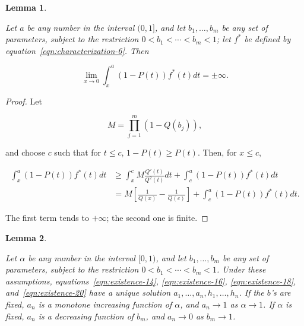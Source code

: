 \documentclass{article}
\newtheorem{lemma}{Lemma}
\theoremstyle{remark}
\begin{document}
\begin{lemma} \label{lemma:infinite-limit}

Let $a$ be any number in the interval $(0, 1]$, and let $b_1, \dots, b_m$ be
any set of parameters, subject to the restriction $0 < b_1 < \cdots < b_m < 1$;
let $f^*$ be defined by equation~\ref{eqn:characterization-6}. Then

\[
\lim_{x \to 0} \int_{x}^a (1-P(t)) f^*(t) dt = \pm \infty.
\]

\end{lemma}

\begin{proof}

Let

\[
M = \prod_{j=1}^m (1 - Q(b_j)),
\]

and choose $c$ such that for $t \leq c$, $1 - P(t) \geq P(t)$. Then, for $x
\leq c$,

\[
\begin{aligned}
\int_{x}^a (1 - P(t)) f^*(t) dt &\geq \int_{x}^c M\frac{Q'(t)}{Q^2(t)} dt
+ \int_{c}^a (1-P(t)) f^*(t) dt \\
&= M \left [ \frac{1}{Q(x)} - \frac{1}{Q(c)} \right ]
+ \int_{c}^a (1-P(t)) f^*(t) dt.
\end{aligned}
\]

The first term tends to $+ \infty$; the second one is finite.

\end{proof}

\begin{lemma} \label{lemma:unique-inc-dec}

Let $\alpha$ be any number in the interval $[0,1)$, and let $b_1, \dots, b_m$
be any set of parameters, subject to the restriction $0 < b_1 < \cdots < b_m <
1$. Under these assumptions, equations~\ref{eqn:existence-14},
\ref{eqn:existence-16}, \ref{eqn:existence-18}, and~\ref{eqn:existence-20} have
a unique solution $a_1, \dots, a_n, h_1, \dots, h_n$. If the $b$'s are fixed,
$a_n$ is a monotone increasing function of $\alpha$, and $a_n \to 1$ as $\alpha
\to 1$. If $\alpha$ is fixed, $a_n$ is a decreasing function of $b_m$, and $a_n
\to 0$ as $b_m \to 1$.

\end{lemma}
\end{document}
